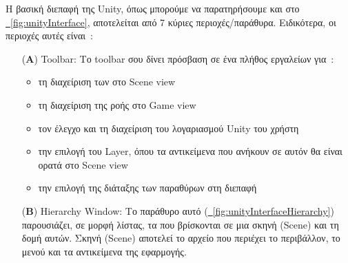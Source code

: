 Η βασική διεπαφή της Unity, όπως μπορούμε να παρατηρήσουμε και στο \hyperref[fig:unityInterface]{\schema~\ref*{fig:unityInterface}}, αποτελείται από 7 κύριες περιοχές/παράθυρα. Ειδικότερα, οι περιοχές αυτές είναι~\cite{unitytechnologies_2023_unitys}:
\begin{itemize}
    \item[(\textbf{A})] Toolbar: Το toolbar σου δίνει πρόσβαση σε ένα πλήθος εργαλείων για~\cite{unitytechnologies_2023_toolbar}: 
    \begin{itemize}
        \item τη διαχείριση των  στο Scene view
        \item τη διαχείριση της ροής στο Game view
        \item τον έλεγχο και τη διαχείριση του λογαριασμού Unity του χρήστη
        \item την επιλογή του Layer, όπου τα αντικείμενα που ανήκουν σε αυτόν θα είναι ορατά στο Scene view
        \item την επιλογή της διάταξης των παραθύρων στη διεπαφή
    \end{itemize}
    \item[(\textbf{B})] Hierarchy Window: Το παράθυρο αυτό (\hyperref[fig:unityInterfaceHierarchy]{\schema~\ref*{fig:unityInterfaceHierarchy}}) παρουσιάζει, σε μορφή λίστας, τα  που βρίσκονται σε μια σκηνή (Scene) και τη δομή αυτών. Σκηνή (Scene) αποτελεί το αρχείο που περιέχει το περιβάλλον, το μενού και τα αντικείμενα της εφαρμογής.
    

\end{itemize}
